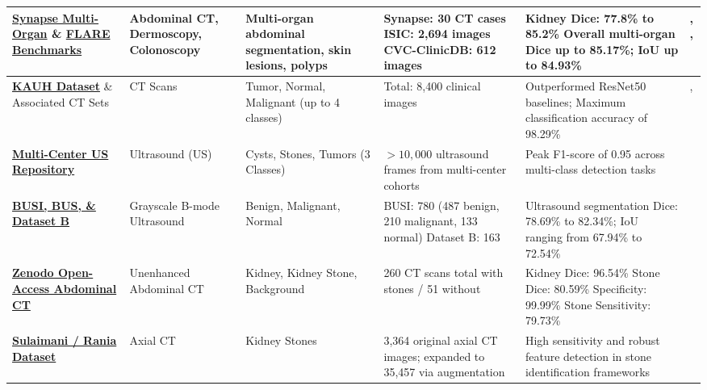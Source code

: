 \documentclass[pdflatex,sn-mathphys-num]{sn-jnl}%
\begin{document}
\begin{longtable}{|L{2.2cm}|L{1.3cm}|L{1.6cm}|L{2.2cm}|L{2.8cm}|L{1.7cm}|}
\hline
\textbf{\href{https://www.synapse.org/#!Synapse:syn3193805/wiki/217789}{Synapse Multi-Organ}} \& \textbf{\href{https://flare.grand-challenge.org/Data/}{FLARE Benchmarks}} & Abdominal CT, Dermoscopy, Colonoscopy & Multi-organ abdominal segmentation, skin lesions, polyps & Synapse: 30 CT cases \newline ISIC: 2,694 images \newline CVC-ClinicDB: 612 images & Kidney Dice: 77.8\% to 85.2\% \newline Overall multi-organ Dice up to 85.17\%; IoU up to 84.93\% & \cite{azad2023daeformer}, \cite{lan2024braunet}, \cite{ma2022flare} \\
\hline
\textbf{\href{https://github.com/DaliaAlzubi/KidneyTumor}{KAUH Dataset}} \& Associated CT Sets & CT Scans & Tumor, Normal, Malignant (up to 4 classes) & Total: 8,400 clinical images & Outperformed ResNet50 baselines; Maximum classification accuracy of 98.29\% & \cite{aljohani2025hierarchical}, \cite{alzubi2022kidney} \\
\hline
\textbf{\href{https://universe.roboflow.com/proyecto-1/tesis-iz9ji}{Multi-Center US Repository}} & Ultrasound (US) & Cysts, Stones, Tumors (3 Classes) & $>10,000$ ultrasound frames from multi-center cohorts & Peak F1-score of 0.95 across multi-class detection tasks & \cite{obaid2025noisy} \\
\hline
\textbf{\href{https://www.sciencedirect.com/science/article/pii/S2352340919312181}{BUSI, BUS, \& Dataset B}} & Grayscale B-mode Ultrasound & Benign, Malignant, Normal & BUSI: 780 (487 benign, 210 malignant, 133 normal) \newline Dataset B: 163 & Ultrasound segmentation Dice: 78.69\% to 82.34\%; IoU ranging from 67.94\% to 72.54\% & \cite{he2023h2former} \\
\hline
\textbf{\href{https://zenodo.org/record/6042410}{Zenodo Open-Access Abdominal CT}} & Unenhanced Abdominal CT & Kidney, Kidney Stone, Background & 260 CT scans total  with stones / 51 without & Kidney Dice: 96.54\% \newline Stone Dice: 80.59\% \newline Specificity: 99.99\% \newline Stone Sensitivity: 79.73\% & \cite{li2022automatic} \\
\hline
\textbf{\href{https://www.kaggle.com/datasets/orvile/axial-ct-imaging-dataset-kidney-stone-detection}{Sulaimani / Rania Dataset}} & Axial CT & Kidney Stones & 3,364 original axial CT images; expanded to 35,457 via augmentation & High sensitivity and robust feature detection in stone identification frameworks & \cite{abdalla2025axial} \\

\end{longtable}
\end{document}

